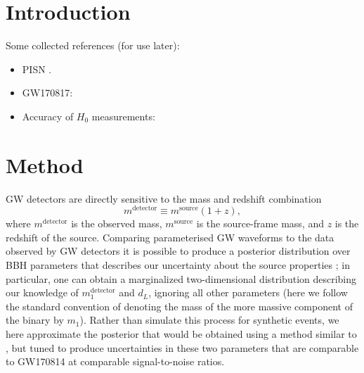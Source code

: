 \documentclass[modern]{aastex62}
\newcommand{\mdet}{m^\mathrm{detector}}
\newcommand{\monedet}{m_1^\mathrm{detector}}
\newcommand{\msource}{m^\mathrm{source}}
\begin{document}
\section{Introduction}

Some collected references (for use later):

\begin{itemize}
  \item \ac{PISN} \cite{Heger2002,Belczynski2016,Woosley2017,Spera2017}.
  \item GW170817: \cite{GW170817,GW170817-H0}
  \item Accuracy of $H_0$ measurements: \cite{GW170817-H0,Chen2017}
\end{itemize}

\section{Method}
\label{sec:method}

\Ac{GW} detectors are directly sensitive to the mass and redshift combination
%
\begin{equation}
  \label{eq:Mdet-definition}
  \mdet \equiv \msource \left( 1 + z \right),
\end{equation}
%
where $\mdet$ is the observed mass, $\msource$ is the source-frame mass, and $z$
is the redshift of the source.  Comparing parameterised \ac{GW} waveforms
\citep[e.g.][]{Taracchini2014,Bohe2017,Smith2016,Kahn2016,Chatziioannou2017} to
the data observed by \ac{GW} detectors it is possible to produce a posterior
distribution over \ac{BBH} parameters that describes our uncertainty about the
source properties \citep{Veitch2015,GW150914-PE}; in particular, one can obtain
a marginalized two-dimensional distribution describing our knowledge of
$\monedet$ and $d_L$, ignoring all other parameters (here we follow the standard
convention of denoting the mass of the more massive component of the binary by
$m_1$).  Rather than simulate this process for synthetic events, we here
approximate the posterior that would be obtained using a method similar to
\citet{Fishbach2018}, but tuned to produce uncertainties in these two parameters
that are comparable to GW170814 \citep{GW170814} at comparable signal-to-noise
ratios.
\end{document}
